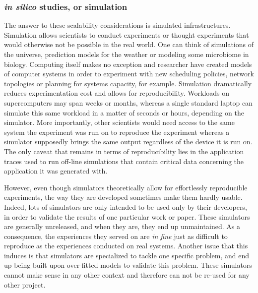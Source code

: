 \subsubsection{\textit{in silico} studies, or simulation}

The answer to these scalability considerations is simulated infrastructures.
Simulation allows scientists to conduct experiments or thought experiments that
would otherwise not be possible in the real world. One can think of simulations
of the universe, prediction models for the weather or modeling some microbiome
in biology. Computing itself makes no exception and researcher have created
models of computer systems in order to experiment with new scheduling policies,
network topologies or planning for systems capacity, for example. Simulation
dramatically reduces experimentation cost and allows for reproducibility.
Workloads on supercomputers may span weeks or months, whereas a single standard
laptop can simulate this same workload in a matter of seconds or hours,
depending on the simulator. More importantly, other scientists would need
access to the same system the experiment was run on to reproduce the experiment
whereas a simulator supposedly brings the same output regardless of the device
it is run on. The only caveat that remains in terms of reproducibility lies in
the application traces used to run off-line simulations that contain critical
data concerning the application it was generated with.

However, even though simulators theoretically allow for effortlessly
reproducible experiments, the way they are developed sometimes make them hardly
usable. Indeed, lots of simulators are only intended to be used only by their
developers, in order to validate the results of one particular work or paper.
These simulators are generally unreleased, and when they are, they end up
unmaintained. As a consequence, the experiences they served on are \textit{in
fine} just as difficult to reproduce as the experiences conducted on real
systems.
Another issue that this induces is that simulators are specialized to tackle
one specific problem, and end up being built upon over-fitted models to
validate this problem. These simulators cannot make sense in any other context
and therefore can not be re-used for any other project.

